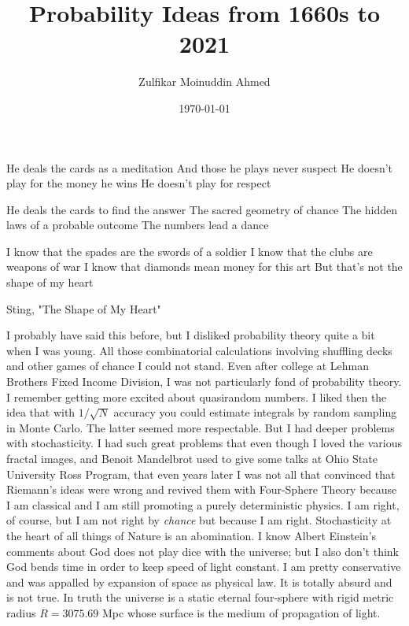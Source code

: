 \documentclass{amsart}
\title{Probability Ideas from 1660s to 2021}
\author{Zulfikar Moinuddin Ahmed}
\date{\today}
\begin{document}
\maketitle

\epigraph{
He deals the cards as a meditation
And those he plays never suspect
He doesn't play for the money he wins
He doesn't play for respect

He deals the cards to find the answer
The sacred geometry of chance
The hidden laws of a probable outcome
The numbers lead a dance

I know that the spades are the swords of a soldier
I know that the clubs are weapons of war
I know that diamonds mean money for this art
But that's not the shape of my heart
}{Sting, "The Shape of My Heart"}

I probably have said this before, but I disliked probability theory quite a bit when I was young.  All those combinatorial calculations involving shuffling decks and other games of chance I could not stand.  Even after college at Lehman Brothers Fixed Income Division, I was not particularly fond of probability theory.  I remember getting more excited about quasirandom numbers.  I liked then the idea that with $1/\sqrt{N}$ accuracy you could estimate integrals by random sampling in Monte Carlo.  The latter seemed more respectable.  But I had deeper problems with stochasticity.  I had such great problems that even though I loved the various fractal images, and Benoit Mandelbrot used to give some talks at Ohio State University Ross Program, that even years later I was not all that convinced that Riemann's ideas were wrong and revived them with Four-Sphere Theory because I am classical and I am still promoting a purely deterministic physics. I am right, of course, but I am not right by {\em chance} but because I am right.  Stochasticity at the heart of all things of Nature is an abomination.  I know Albert Einstein's comments about God does not play dice with the universe; but I also don't think God bends time in order to keep speed of light constant.  I am pretty conservative and was appalled by expansion of space as physical law.  It is totally absurd and is not true.  In truth the universe is a static eternal four-sphere with rigid metric radius $R=3075.69$ Mpc whose surface is the medium of propagation of light.  
\end{document}
